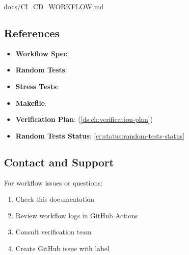 \begin{relocated}{docs/CI_CD_WORKFLOW.md}
\subsection{References}\label{um:flow:ci-cd-workflow:references}

\begin{itemize}
\tightlist
\item
  \textbf{Workflow Spec}: 
\item
  \textbf{Random Tests}: 
\item
  \textbf{Stress Tests}: 
\item
  \textbf{Makefile}: 
\item
  \textbf{Verification Plan}:
   (\cref{ds:ch:verification-plan})
\item
  \textbf{Random Tests Status}: \cref{cr:status:random-tests-status}
\end{itemize}

\subsection{Contact and Support}\label{um:flow:ci-cd-workflow:contact-and-support}

For workflow issues or questions:

\begin{enumerate}
\def\labelenumi{\arabic{enumi}.}
\tightlist
\item
  Check this documentation
\item
  Review workflow logs in GitHub Actions
\item
  Consult verification team
\item
  Create GitHub issue with  label
\end{enumerate}
\end{relocated}

